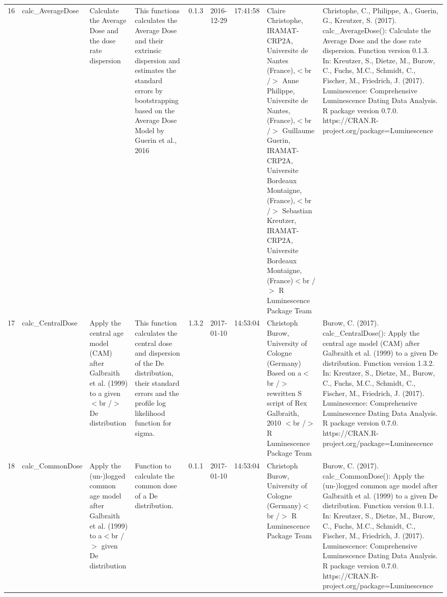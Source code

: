 \begin{table}[ht]
\begin{tabular}{rllllllll}
 \\ 
  16 & calc\_AverageDose & Calculate the Average Dose and the dose rate dispersion & This functions calculates the Average Dose and their extrinsic dispersion and estimates the standard errors by bootstrapping based on the Average Dose Model by Guerin et al., 2016 & 0.1.3 & 2016-12-29 & 17:41:58
 & Claire Christophe, IRAMAT-CRP2A, Universite de Nantes (France),$<$br /$>$ Anne Philippe, Universite de Nantes, (France),$<$br /$>$ Guillaume Guerin, IRAMAT-CRP2A, Universite Bordeaux Montaigne, (France),$<$br /$>$ Sebastian Kreutzer, IRAMAT-CRP2A, Universite Bordeaux Montaigne, (France)$<$br /$>$  R Luminescence Package Team & Christophe, C., Philippe, A., Guerin, G., Kreutzer, S. (2017). calc\_AverageDose(): Calculate the Average Dose and the dose rate dispersion. Function version 0.1.3. In: Kreutzer, S., Dietze, M., Burow, C., Fuchs, M.C., Schmidt, C., Fischer, M., Friedrich, J. (2017). Luminescence: Comprehensive Luminescence Dating Data Analysis. R package version 0.7.0. https://CRAN.R-project.org/package=Luminescence
 \\ 
  17 & calc\_CentralDose & Apply the central age model (CAM) after Galbraith et al. (1999) to a given$<$br /$>$ De distribution & This function calculates the central dose and dispersion of the De distribution, their standard errors and the profile log likelihood function for sigma. & 1.3.2 & 2017-01-10 & 14:53:04
 & Christoph Burow, University of Cologne (Germany)   Based on a$<$br /$>$ rewritten S script of Rex Galbraith, 2010  $<$br /$>$  R Luminescence Package Team & Burow, C. (2017). calc\_CentralDose(): Apply the central age model (CAM) after Galbraith et al. (1999) to a given De distribution. Function version 1.3.2. In: Kreutzer, S., Dietze, M., Burow, C., Fuchs, M.C., Schmidt, C., Fischer, M., Friedrich, J. (2017). Luminescence: Comprehensive Luminescence Dating Data Analysis. R package version 0.7.0. https://CRAN.R-project.org/package=Luminescence
 \\ 
  18 & calc\_CommonDose & Apply the (un-)logged common age model after Galbraith et al. (1999) to a$<$br /$>$ given De distribution & Function to calculate the common dose of a De distribution. & 0.1.1 & 2017-01-10 & 14:53:04
 & Christoph Burow, University of Cologne (Germany)$<$br /$>$  R Luminescence Package Team & Burow, C. (2017). calc\_CommonDose(): Apply the (un-)logged common age model after Galbraith et al. (1999) to a given De distribution. Function version 0.1.1. In: Kreutzer, S., Dietze, M., Burow, C., Fuchs, M.C., Schmidt, C., Fischer, M., Friedrich, J. (2017). Luminescence: Comprehensive Luminescence Dating Data Analysis. R package version 0.7.0. https://CRAN.R-project.org/package=Luminescence

\end{tabular}
\end{table}
